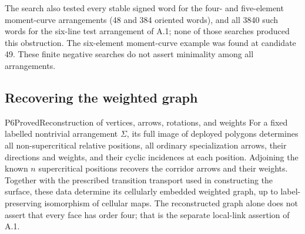 The search also tested every stable signed word for the four- and
five-element moment-curve arrangements (48 and 384 oriented words),
and all 3840 such words for the six-line test arrangement of A.1;
none of those searches produced this obstruction.  The six-element
moment-curve example was found at candidate 49.  These finite negative
searches do not assert minimality among all arrangements.

\subsection{Recovering the weighted graph}

\begin{resultenv}{P6}{Proved}{Reconstruction of vertices, arrows, rotations, and weights}
For a fixed labelled nontrivial arrangement $\Sigma$, its full image of
deployed polygons determines all non-supercritical relative positions,
all ordinary specialization arrows, their directions and weights, and
their cyclic incidences at each position.  Adjoining the known $n$
supercritical positions recovers the corridor arrows and their
weights.  Together with the prescribed transition transport used in
constructing the surface, these data determine its cellularly embedded
weighted graph, up to label-preserving isomorphism of cellular maps.
The reconstructed graph alone does not assert that every face has
order four; that is the separate local-link assertion of A.1.
\end{resultenv}


